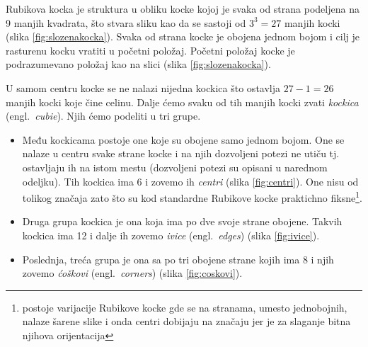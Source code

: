 \documentclass[a4paper]{article}
\begin{document}
Rubikova kocka je struktura u obliku kocke kojoj je svaka od strana podeljena na 9 manjih kvadrata, što stvara sliku kao da se sastoji od $3^3 = 27$ manjih kocki (slika \ref{fig:slozenakocka}).
Svaka od strana kocke je obojena jednom bojom i cilj je rasturenu kocku vratiti u početni položaj. Početni položaj kocke je podrazumevano položaj kao na slici (slika \ref{fig:slozenakocka}).

U samom centru kocke se ne nalazi nijedna kockica što ostavlja $27 - 1 = 26$ manjih kocki koje čine celinu. Dalje ćemo svaku od tih manjih kocki zvati \textit{kockica} (engl.~{\em cubie}).
Njih ćemo podeliti u tri grupe.    
    
    \begin{figure}[h]
        \centering
        \caption{}
        \label{fig:kockice}
    \end{figure}
    
\begin{itemize}
\item Među kockicama postoje one koje su obojene samo jednom bojom.
    One se nalaze u centru svake strane kocke i na njih dozvoljeni potezi ne utiču tj. ostavljaju ih na istom mestu (dozvoljeni potezi su opisani u narednom odeljku).
    Tih kockica ima 6 i zovemo ih \textit{centri} (slika \ref{fig:centri}). One nisu od tolikog značaja zato što su kod standardne Rubikove kocke praktichno fiksne\footnote{postoje varijacije Rubikove kocke gde se na stranama, umesto jednobojnih, nalaze šarene slike i onda centri dobijaju na značaju jer je za slaganje bitna njihova orijentacija}.
\item Druga grupa kockica je ona koja ima po dve svoje strane obojene.
    Takvih kockica ima 12 i dalje ih zovemo \textit{ivice} (engl.~{\em edges}) (slika \ref{fig:ivice}).
\item Poslednja, treća grupa je ona sa po tri obojene strane kojih ima 8 i njih zovemo \textit{ćoškovi} (engl.~{\em corners}) (slika \ref{fig:coskovi}).
\end{itemize} 
\end{document}
